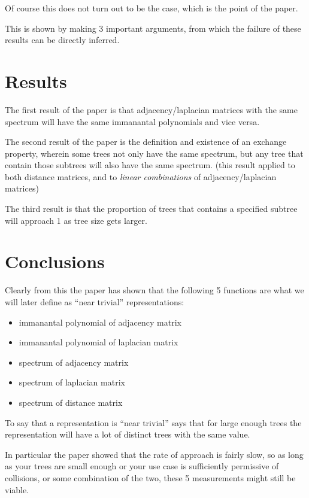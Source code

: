 \documentclass[10pt,a4paper]{report}
\begin{document}
Of course this does not turn out to be the case, which is the point of the
paper.

This is shown by making 3 important arguments, from which the failure of these
results can be directly inferred.

\section{Results}

The first result of the paper is that adjacency/laplacian matrices with the
same spectrum will have the same immanantal polynomials and vice versa.

The second result of the paper is the definition and existence of an exchange
property, wherein some trees not only have the same spectrum, but any tree that
contain those subtrees will also have the same spectrum. (this result applied
to both distance matrices, and to \emph{linear combinations} of
adjacency/laplacian matrices)

The third result is that the proportion of trees that contains a specified
subtree will approach 1 as tree size gets larger.

\section{Conclusions}

Clearly from this the paper has shown that the following 5 functions are what
we will later define as ``near trivial'' representations:
\begin{itemize}
	\item immanantal polynomial of adjacency matrix
	\item immanantal polynomial of laplacian matrix
	\item spectrum of adjacency matrix
	\item spectrum of laplacian matrix
	\item spectrum of distance matrix
\end{itemize}

To say that a representation is ``near trivial'' says that for large enough
trees the representation will have a lot of distinct trees with the same
value.

In particular the paper showed that the rate of approach is fairly slow, so as
long as your trees are small enough or your use case is sufficiently permissive
of collisions, or some combination of the two, these 5 measurements might still
be viable.
\end{document}
